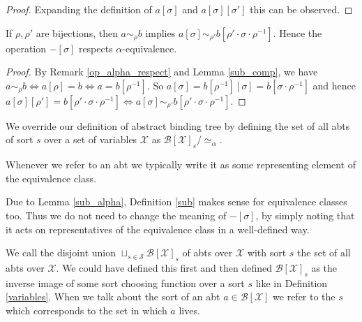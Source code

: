 \begin{proof}
    Expanding the definition of $a[\sigma]$ and $a[\sigma][\sigma']$ this can be observed.
\end{proof}

\begin{lemma}\label{sub_alpha}
    If $\rho, \rho'$ are bijections, then $a \sim_\rho b$ implies $a[\sigma] \sim_{\rho'} b[\rho ' \cdot \sigma \cdot \rho^{-1}]$. Hence the operation $-[\sigma]$ respects $\alpha$-equivalence.
\end{lemma}

\begin{proof}
    By Remark \ref{op_alpha_respect} and Lemma \ref{sub_comp}, we have $a \sim_\rho b \iff a[\rho] = b \iff a = b[\rho^{-1}]$. So $a[\sigma] = b[\rho^{-1}][\sigma]=b[\sigma \cdot \rho^{-1}]$ and hence  $a[\sigma][\rho']=b[\rho' \cdot \sigma \cdot \rho^{-1}]\iff a[\sigma] \sim_{\rho'} b[\rho' \cdot \sigma \cdot \rho^{-1}]$.
\end{proof}

%
\begin{defin}
    We override our definition of abstract binding tree by defining the set of all abts of sort $s$ over a set of variables $\mathcal{X}$ as $\mathcal{B}[\mathcal{X}]_s / \simeq_{\alpha}$.
\end{defin}

\begin{remark}
    Whenever we refer to an abt we typically write it as some representing element of the equivalence class.
\end{remark}

\begin{remark}
    Due to Lemma \ref{sub_alpha}, Definition \ref{sub} makes sense for equivalence classes too. Thus we do not need to change the meaning of $-[\sigma]$, by simply noting that it acts on representatives of the equivalence class in a well-defined way.
\end{remark}

\begin{defin}
    We call the disjoint union $\sqcup_{s \in \mathcal{S}} \mathcal{B}[\mathcal{X}]_s$ of abts over $\mathcal{X}$ with sort $s$ the set of all abts over $\mathcal{X}$. We could have defined this first and then defined $\mathcal{B}[\mathcal{X}]_s$ as the inverse image of some sort choosing function over a sort $s$ like in Definition \ref{variables}. When we talk about the sort of an abt $a \in \mathcal{B}[\mathcal{X}]$ we refer to the $s$ which corresponds to the set in which $a$ lives. 
\end{defin}

